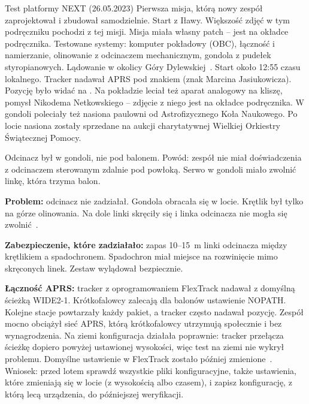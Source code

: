 \clearpage
\begin{sekcja}{Test platformy NEXT (26.05.2023)}
Pierwsza misja, którą nowy zespół zaprojektował i zbudował samodzielnie. Start z Iławy. Większość zdjęć w tym podręczniku pochodzi z tej misji. Misja miała własny patch -- jest na okładce podręcznika. Testowane systemy: komputer pokładowy (OBC), łączność i namierzanie, olinowanie z odcinaczem mechanicznym, gondola z pudełek styropianowych. Lądowanie w okolicy Góry Dylewskiej~\cite{blog2023}. Start około 12:55 czasu lokalnego. Tracker nadawał APRS pod znakiem  (znak Marcina Jasiukowicza). Pozycję było widać na . Na pokładzie leciał też aparat analogowy na kliszę, pomysł Nikodema Netkowskiego -- zdjęcie z niego jest na okładce podręcznika. W gondoli poleciały też nasiona paulowni od Astrofizycznego Koła Naukowego. Po locie nasiona zostały sprzedane na aukcji charytatywnej Wielkiej Orkiestry Świątecznej Pomocy.

Odcinacz był w gondoli, nie pod balonem. Powód: zespół nie miał doświadczenia z odcinaczem sterowanym zdalnie pod powłoką. Serwo w gondoli miało zwolnić linkę, która trzyma balon.

\textbf{Problem:} odcinacz nie zadziałał. Gondola obracała się w locie. Krętlik był tylko na górze olinowania. Na dole linki skręciły się i linka odcinacza nie mogła się zwolnić~\cite{pac2024}.

\textbf{Zabezpieczenie, które zadziałało:} zapas 10--15~m linki odcinacza między krętlikiem a spadochronem. Spadochron miał miejsce na rozwinięcie mimo skręconych linek. Zestaw wylądował bezpiecznie.

\textbf{Łączność APRS:} tracker z oprogramowaniem FlexTrack nadawał z domyślną ścieżką WIDE2-1. Krótkofalowcy zalecają dla balonów ustawienie NOPATH. Kolejne stacje powtarzały każdy pakiet, a tracker często nadawał pozycję. Zespół mocno obciążył sieć APRS, którą krótkofalowcy utrzymują społecznie i bez wynagrodzenia. Na ziemi konfiguracja działała poprawnie: tracker przełącza ścieżkę dopiero powyżej ustawionej wysokości, więc test na ziemi nie wykrył problemu. Domyślne ustawienie w FlexTrack zostało później zmienione~\cite{flextrackpr}. Wniosek: przed lotem sprawdź wszystkie pliki konfiguracyjne, także ustawienia, które zmieniają się w locie (z wysokością albo czasem), i zapisz konfigurację, z którą lecą urządzenia, do późniejszej weryfikacji.

\end{sekcja}

